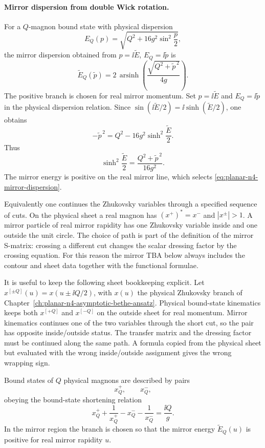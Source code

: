 \paragraph{Mirror dispersion from double Wick rotation.}
For a \(Q\)-magnon bound state with physical dispersion
\[
  E_Q(p)=\sqrt{Q^2+16g^2\sin^2\frac p2},
\]
the mirror dispersion obtained from
\(p=\ii\widetilde E\), \(E_Q=\ii\widetilde p\) is
\begin{equation}
  \widetilde E_Q(\widetilde p)
  =
  2\,\operatorname{arsinh}
  \left(
    \frac{\sqrt{Q^2+\widetilde p^{\,2}}}{4g}
  \right).
  \label{eq:planar-n4-mirror-dispersion}
\end{equation}
The positive branch is chosen for real mirror momentum.
Set \(p=\ii\widetilde E\) and \(E_Q=\ii\widetilde p\) in the physical
dispersion relation.  Since
\(\sin(\ii\widetilde E/2)=\ii\sinh(\widetilde E/2)\), one obtains
\[
  -\widetilde p^{\,2}
  =
  Q^2-16g^2\sinh^2\frac{\widetilde E}{2}.
\]
Thus
\[
  \sinh^2\frac{\widetilde E}{2}
  =
  \frac{Q^2+\widetilde p^{\,2}}{16g^2}.
\]
The mirror energy is positive on the real mirror line, which selects
\eqref{eq:planar-n4-mirror-dispersion}.

Equivalently one continues the Zhukovsky variables through a specified
sequence of cuts.  On the physical sheet a real magnon has
\((x^+)^*=x^-\) and \(|x^\pm|>1\).  A mirror particle of real mirror rapidity
has one Zhukovsky variable inside and one outside the unit circle.  The
choice of path is part of the definition of the mirror S-matrix: crossing a
different cut changes the scalar dressing factor by the crossing equation.
For this reason the mirror TBA below always includes the contour and sheet
data together with the functional formulae.

It is useful to keep the following sheet bookkeeping explicit.  Let
\(x^{[\pm Q]}(u)=x(u\pm\ii Q/2)\), with \(x(u)\) the physical Zhukovsky
branch of Chapter~\ref{ch:planar-n4-asymptotic-bethe-ansatz}.  Physical
bound-state kinematics keeps both \(x^{[+Q]}\) and \(x^{[-Q]}\) on the
outside sheet for real momentum.  Mirror kinematics continues one of the two
variables through the short cut, so the pair has opposite inside/outside
status.  The transfer matrix and the dressing factor must be continued along
the same path.  A formula copied from the physical sheet but evaluated with
the wrong inside/outside assignment gives the wrong wrapping sign.

Bound states of \(Q\) physical magnons are described by pairs
\[
  x_Q^+,\qquad x_Q^-,
\]
obeying the bound-state shortening relation
\[
  x_Q^++\frac1{x_Q^+}-x_Q^- -\frac1{x_Q^-}
  =
  \frac{\ii Q}{g}.
\]
In the mirror region the branch is chosen so that the mirror energy
\(\widetilde E_Q(u)\) is positive for real mirror rapidity \(u\).

